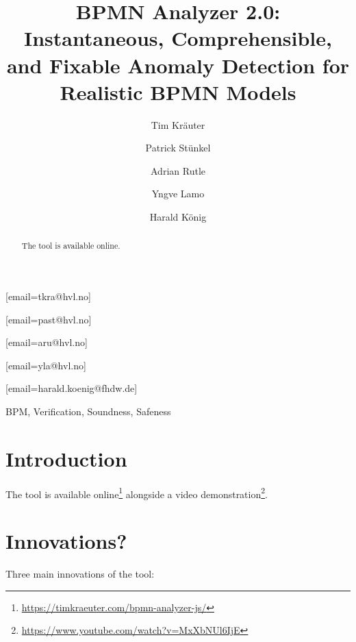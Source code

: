 \documentclass[
twocolumn,
]{ceurart}
\begin{document}


\title{BPMN Analyzer 2.0: Instantaneous, Comprehensible, and Fixable Anomaly Detection for Realistic BPMN Models}

\author[1]{Tim Kräuter}
[email=tkra@hvl.no]
\author[1]{Patrick Stünkel}
[email=past@hvl.no] %
\author[1]{Adrian Rutle}
[email=aru@hvl.no]
\author[1]{Yngve Lamo}
[email=yla@hvl.no]
\author[2,1]{Harald König}
[email=harald.koenig@fhdw.de]
\address[1]{Western Norway University of Applied Sciences, Bergen, Norway}
\address[2]{FHDW Hannover, Germany}

\begin{abstract}
  The tool is available online.
\end{abstract}

\begin{keywords}
BPM,
Verification,
Soundness,
Safeness
\end{keywords}

\maketitle


\section{Introduction}
The tool is available online\footnote{\url{https://timkraeuter.com/bpmn-analyzer-js/}} alongside a video demonstration\footnote{\url{https://www.youtube.com/watch?v=MxXbNUl6IjE}}.

\section{Innovations?} %
Three main innovations of the tool:
\end{document}

